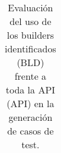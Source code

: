 \begin{table}[H]
\begin{tabular}{ c l c c}
\end{tabular}%

\caption{Evaluación del uso de los builders identificados (BLD) frente a toda la API (API) en la generación de casos de test.}
\label{tab:results-obj}
\end{table}